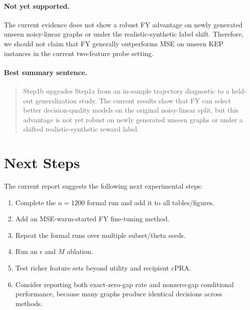 \paragraph{Not yet supported.}
The current evidence does not show a robust FY advantage on newly generated
unseen noisy-linear graphs or under the realistic-synthetic label shift.
Therefore, we should not claim that FY generally outperforms MSE on unseen KEP
instances in the current two-feature probe setting.

\paragraph{Best summary sentence.}
\begin{quote}
Step1b upgrades Step1a from an in-sample trajectory diagnostic to a held-out
generalization study. The current results show that FY can select better
decision-quality models on the original noisy-linear split, but this advantage is
not yet robust on newly generated unseen graphs or under a shifted
realistic-synthetic reward label.
\end{quote}

\section{Next Steps}

The current report suggests the following next experimental steps:

\begin{enumerate}
    \item Complete the \(n=1200\) formal run and add it to all tables/figures.
    \item Add an MSE-warm-started FY fine-tuning method.
    \item Repeat the formal runs over multiple subset/theta seeds.
    \item Run an \(\epsilon\) and \(M\) ablation.
    \item Test richer feature sets beyond utility and recipient cPRA.
    \item Consider reporting both exact-zero-gap rate and nonzero-gap
    conditional performance, because many graphs produce identical decisions
    across methods.
\end{enumerate}

